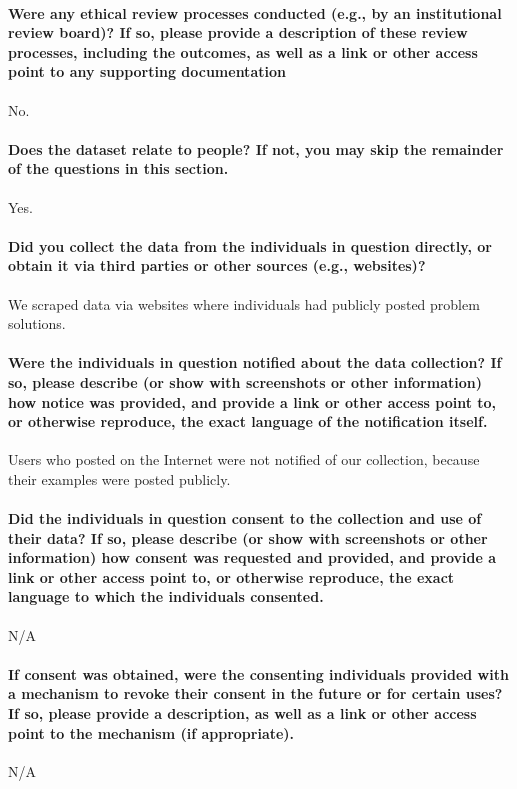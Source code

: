 \paragraph{Were any ethical review processes conducted (e.g., by an institutional review board)? If so, please provide a description of these review
processes, including the outcomes, as well as a link or other access point
to any supporting documentation}
No.

\paragraph{Does the dataset relate to people? If not, you may skip the remainder
of the questions in this section.}
Yes.

\paragraph{Did you collect the data from the individuals in question directly,
or obtain it via third parties or other sources (e.g., websites)?}
We scraped data via websites where individuals had publicly posted problem solutions.

\paragraph{Were the individuals in question notified about the data collection? If so, please describe (or show with screenshots or other information) how notice was provided, and provide a link or other access point to, or otherwise reproduce, the exact language of the notification itself.}
Users who posted on the Internet were not notified of our collection, because their examples were posted publicly.

\paragraph{Did the individuals in question consent to the collection and use
of their data? If so, please describe (or show with screenshots or other
information) how consent was requested and provided, and provide a
link or other access point to, or otherwise reproduce, the exact language
to which the individuals consented.}
N/A

\paragraph{If consent was obtained, were the consenting individuals provided with a mechanism to revoke their consent in the future or
for certain uses? If so, please provide a description, as well as a link or
other access point to the mechanism (if appropriate).}
N/A

